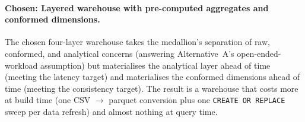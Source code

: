 \paragraph{Chosen: Layered warehouse with pre-computed
aggregates and conformed dimensions.}
The chosen four-layer warehouse takes the medallion's separation
of raw, conformed, and analytical concerns
(answering Alternative~A's open-ended-workload assumption) but
materialises the analytical layer ahead of time
(meeting the latency target) and materialises the conformed
dimensions ahead of time (meeting the consistency target). The
result is a warehouse that costs more at build time (one CSV
$\rightarrow$ parquet conversion plus one
\texttt{CREATE OR REPLACE} sweep per data refresh) and almost
nothing at query time.
